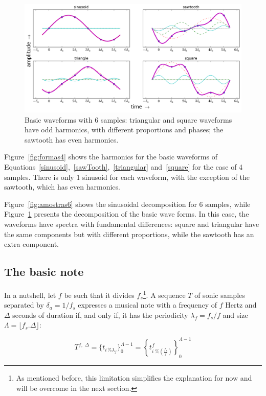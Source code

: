 \begin{figure}[!h!]
    \centering
        \includegraphics[width=.9\textwidth]{figures/amostras6formas___}
    \caption{Basic waveforms with 6 samples: triangular and square waveforms have odd harmonics, with different proportions and phases; the sawtooth has even harmonics.}
        \label{fig:formas6}
\end{figure}

Figure~\ref{fig:formas4} shows the harmonics for the basic waveforms of Equations~\ref{sinusoid},~\ref{sawTooth},~\ref{triangular} and~\ref{square} for the case of 4 samples. There is only 1 sinusoid for each waveform, with the exception of the sawtooth, which has even harmonics.

Figure~\ref{fig:amostras6} shows the sinusoidal decomposition for 6 samples, while Figure~\ref{fig:formas6} presents the decomposition of the basic wave forms. In this case, the waveforms have spectra with fundamental differences: square and triangular have the same components but with different proportions, while the sawtooth has an extra component.

\subsection{The basic note}\label{notaBasica}
In a nutshell, let $f$ be such that it divides $f_s$\footnote{As mentioned before, this limitation simplifies the explanation for now and will be overcome in the next section.}. A sequence $T$ of sonic samples separated by $\delta_a=1/f_s$ expresses a musical note with a frequency of $f$ Hertz and $\Delta$ seconds of duration if, and only if, it has the periodicity $\lambda_f=f_s/f$ and size $\Lambda=\lfloor f_s . \Delta \rfloor$:

\begin{equation}\label{eq:notaBasica}
T^{f,\; \Delta}=\{t_{i \, \% \lambda_f} \}_0^{\Lambda-1}= \left \{t^f_{i \; \% \left( \frac{f_s}{f} \right) } \right \}_0^{\Lambda-1}
\end{equation}

